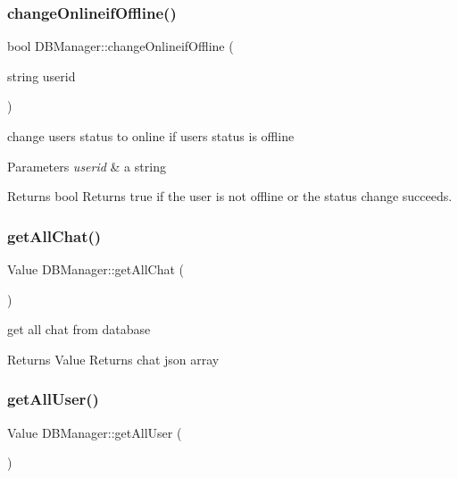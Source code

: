 \subsubsection{\texorpdfstring{change\+Onlineif\+Offline()}{changeOnlineifOffline()}}
{\footnotesize\ttfamily bool D\+B\+Manager\+::change\+Onlineif\+Offline (\begin{DoxyParamCaption}\item[{string}]{userid }\end{DoxyParamCaption})}



change user\textquotesingle{}s status to online if user\textquotesingle{}s status is offline 


\begin{DoxyParams}{Parameters}
{\em userid} & a string \\
\hline
\end{DoxyParams}
\begin{DoxyReturn}{Returns}
bool Returns true if the user is not offline or the status change succeeds. 
\end{DoxyReturn}
\mbox{\label{class_d_b_manager_a546cf5b82fe9cb115cfee8d52f90f0da}} 
\subsubsection{\texorpdfstring{get\+All\+Chat()}{getAllChat()}}
{\footnotesize\ttfamily Value D\+B\+Manager\+::get\+All\+Chat (\begin{DoxyParamCaption}{ }\end{DoxyParamCaption})}



get all chat from database 

\begin{DoxyReturn}{Returns}
Value Returns chat json array 
\end{DoxyReturn}
\mbox{\label{class_d_b_manager_a0171d3489ef375c9eeff4014a4a485de}} 
\subsubsection{\texorpdfstring{get\+All\+User()}{getAllUser()}}
{\footnotesize\ttfamily Value D\+B\+Manager\+::get\+All\+User (\begin{DoxyParamCaption}{ }\end{DoxyParamCaption})}



